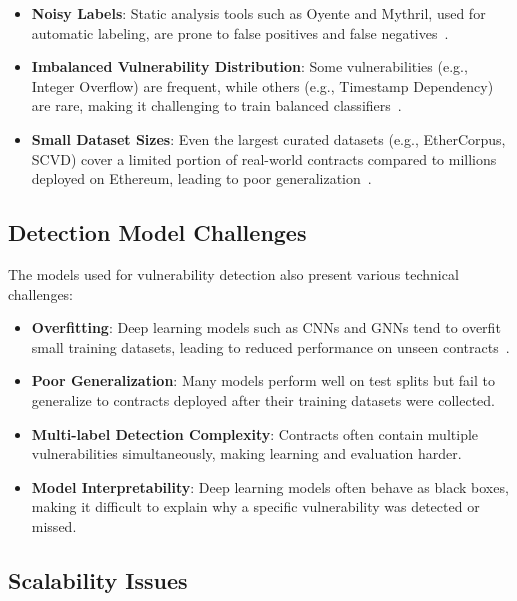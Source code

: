 \begin{itemize}
    \item \textbf{Noisy Labels}: Static analysis tools such as Oyente and Mythril, used for automatic labeling, are prone to false positives and false negatives~\cite{durieux2020empirical}.
    
    \item \textbf{Imbalanced Vulnerability Distribution}: Some vulnerabilities (e.g., Integer Overflow) are frequent, while others (e.g., Timestamp Dependency) are rare, making it challenging to train balanced classifiers~\cite{zhang2020scvd}.
    
    \item \textbf{Small Dataset Sizes}: Even the largest curated datasets (e.g., EtherCorpus, SCVD) cover a limited portion of real-world contracts compared to millions deployed on Ethereum, leading to poor generalization~\cite{tann2020towards}.
\end{itemize}

\subsection*{Detection Model Challenges}

The models used for vulnerability detection also present various technical challenges:

\begin{itemize}
    \item \textbf{Overfitting}: Deep learning models such as CNNs and GNNs tend to overfit small training datasets, leading to reduced performance on unseen contracts~\cite{lesimple2020master}.
    
    \item \textbf{Poor Generalization}: Many models perform well on test splits but fail to generalize to contracts deployed after their training datasets were collected.
    
    \item \textbf{Multi-label Detection Complexity}: Contracts often contain multiple vulnerabilities simultaneously, making learning and evaluation harder.
    
    \item \textbf{Model Interpretability}: Deep learning models often behave as black boxes, making it difficult to explain why a specific vulnerability was detected or missed.
\end{itemize}

\subsection*{Scalability Issues}

